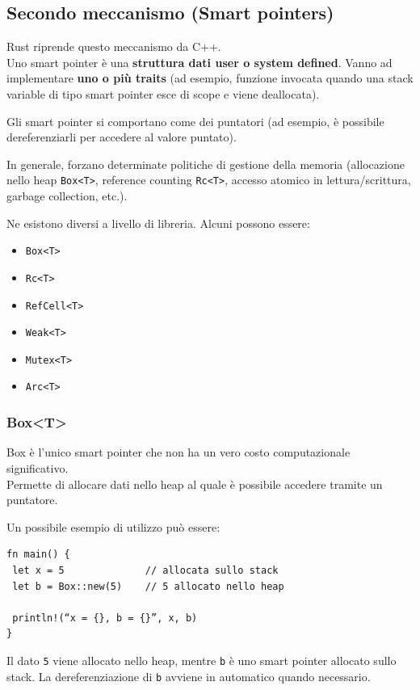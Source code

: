 \documentclass{article}
\begin{document}
\pagebreak

\subsection*{Secondo meccanismo (Smart pointers)}
Rust riprende questo meccanismo da C++.\\
Uno smart pointer è una \textbf{struttura dati user o system defined}. Vanno ad implementare \textbf{uno o più traits} (ad esempio, funzione invocata quando una stack variable di tipo smart pointer esce di scope e viene deallocata).

Gli smart pointer si comportano come dei puntatori (ad esempio, è possibile dereferenziarli per accedere al valore puntato).

In generale, forzano determinate politiche di gestione della memoria (allocazione nello heap \texttt{Box<T>}, reference counting \texttt{Rc<T>}, accesso atomico in lettura/scrittura, garbage collection, etc.).

Ne esistono diversi a livello di libreria. Alcuni possono essere:
\begin{itemize}
    \item \texttt{Box<T>}
    \item \texttt{Rc<T>}
    \item \texttt{RefCell<T>}
    \item \texttt{Weak<T>}
    \item \texttt{Mutex<T>}
    \item \texttt{Arc<T>}
\end{itemize}

\subsubsection*{Box<T>}
Box è l'unico smart pointer che non ha un vero costo computazionale significativo.\\
Permette di allocare dati nello heap al quale è possibile accedere tramite un puntatore.

Un possibile esempio di utilizzo può essere:
\begin{tcolorbox}
\begin{verbatim}
fn main() {
 let x = 5              // allocata sullo stack
 let b = Box::new(5)    // 5 allocato nello heap 

 println!(“x = {}, b = {}”, x, b)
}
\end{verbatim}
\end{tcolorbox}
Il dato \texttt{5} viene allocato nello heap, mentre \texttt{b} è uno smart pointer allocato sullo stack. La dereferenziazione di \texttt{b} avviene in automatico quando necessario.
\end{document}

